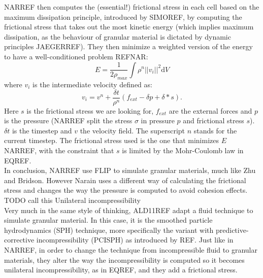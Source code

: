 NARREF then computes the (essential!) frictional stress in each cell based on the maximum dissipation principle, introduced by SIMOREF, by computing the frictional stress that takes out the most kinetic energy (which implies maximum dissipation, as the behaviour of granular material is dictated by dynamic principles JAEGERREF). They then minimize a weighted version of the energy to have a well-conditioned problem REFNAR:
\begin{equation}
E = \frac{1}{2 \rho_{max}} \int \rho^n ||v_i||^2 \mathrm{d}V
\end{equation} 
where $v_i$ is the intermediate velocity defined as:
\begin{equation}
v_i = v^n + \frac{\delta t}{\rho^n} (f_{ext} - \delta p + \delta * s).
\end{equation}
Here $s$ is the frictional stress we are looking for, $f_{ext}$ are the external forces and $p$ is the pressure (NARREF split the stress $\sigma$ in pressure $p$ and frictional stress $s$). $\delta t$ is the timestep and $v$ the velocity field. The superscript $n$ stands for the current timestep. The frictional stress used is the one that minimizes $E$ NARREF, with the constraint that $s$ is limited by the Mohr-Coulomb law in EQREF.\\

In conclusion, NARREF use FLIP to simulate granular materials, much like Zhu and Bridson. However Narain uses a different way of calculating the frictional stress and changes the way the pressure is computed to avoid cohesion effects. TODO call this Unilateral incompressibility\\

Very much in the same style of thinking, ALD11REF adapt a fluid technique to simulate granular material. In this case, it is the smoothed particle hydrodynamics (SPH) technique, more specifically the variant with predictive-corrective incompressibility (PCISPH) as introduced by REF. Just like in NARREF, in order to change the technique from incompressible fluid to granular materials, they alter the way the incompressibility is computed so it becomes unilateral incompressibility, as in EQREF, and they add a frictional stress.\\

